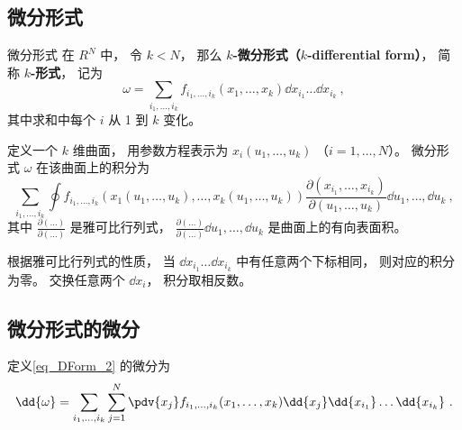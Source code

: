 \subsection{微分形式}
\begin{definition}{微分形式}
在 $R^N$ 中， 令 $k < N$， 那么 \textbf{$k$-微分形式（$k$-differential form）}， 简称 \textbf{$k$-形式}， 记为
\begin{equation}\label{eq_DForm_2}
\omega = \sum_{i_1,\dots,i_k} f_{i_1,\dots,i_k}(x_1,\dots,x_k) \dd{x_{i_1}}\dots\dd{x_{i_k}}~,
\end{equation}
其中求和中每个 $i$ 从 1 到 $k$ 变化。

定义一个 $k$ 维曲面， 用参数方程表示为 $x_i(u_1,\dots,u_k)$ （$i=1,\dots,N$）。 微分形式 $\omega$ 在该曲面上的积分为
\begin{equation}
\sum_{i_1,\dots,i_k} \oint f_{i_1,\dots,i_k}(x_1(u_1,\dots,u_k),\dots,x_k(u_1,\dots,u_k)) \frac{\partial(x_{i_1},\dots,x_{i_k})}{\partial(u_1,\dots,u_k)} \dd{u_1},\dots,\dd{u_k}~,
\end{equation}
其中 $\frac{\partial(\dots)}{\partial(\dots)}$ 是雅可比行列式， $\frac{\partial(\dots)}{\partial(\dots)}\dd{u_1},\dots,\dd{u_k}$ 是曲面上的有向表面积。
\end{definition}
根据雅可比行列式的性质， 当 $\dd{x_{i_1}}\dots\dd{x_{i_k}}$ 中有任意两个下标相同， 则对应的积分为零。 交换任意两个 $\dd{x_i}$， 积分取相反数。

\subsection{微分形式的微分}
定义\autoref{eq_DForm_2} 的微分为
\begin{equation}
\dd{\omega} = \sum_{i_1,\dots,i_k}\sum_{j=1}^N \pdv{x_j} f_{i_1,\dots,i_k}(x_1,\dots,x_k) \dd{x_j}\dd{x_{i_1}}\dots\dd{x_{i_k}}~.
\end{equation}

